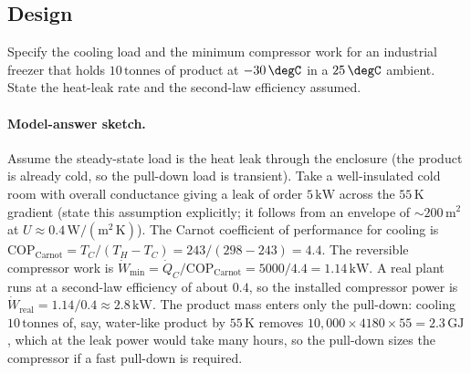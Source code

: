 \subsection*{Design}

\begin{exercise}
Specify the cooling load and the minimum compressor work for an
industrial freezer that holds $10\,\text{tonnes}$ of product at
$-30\,\degC$ in a $25\,\degC$ ambient. State the heat-leak rate and
the second-law efficiency assumed.

\paragraph{Model-answer sketch.} Assume the steady-state load is the
heat leak through the enclosure (the product is already cold, so the
pull-down load is transient). Take a well-insulated cold room with
overall conductance giving a leak of order $5\,\text{kW}$ across the
$55\,\si{\kelvin}$ gradient (state this assumption explicitly; it
follows from an envelope of $\sim 200\,\text{m}^2$ at
$U \approx 0.4\,\text{W}/(\text{m}^2\,\si{\kelvin})$). The Carnot
coefficient of performance for cooling is
$\mathrm{COP}_{\text{Carnot}} = T_C/(T_H - T_C) = 243/(298 - 243) =
4.4$. The reversible compressor work is
$\dot W_{\min} = \dot Q_C/\mathrm{COP}_{\text{Carnot}} = 5000/4.4 =
1.14\,\text{kW}$. A real plant runs at a second-law efficiency of about
$0.4$, so the installed compressor power is
$\dot W_{\text{real}} = 1.14/0.4 \approx 2.8\,\text{kW}$. The product
mass enters only the pull-down: cooling $10\,\text{tonnes}$ of, say,
water-like product by $55\,\si{\kelvin}$ removes
$10{,}000 \times 4180 \times 55 = 2.3\,\text{GJ}$, which at the leak
power would take many hours, so the pull-down sizes the compressor if a
fast pull-down is required.
\end{exercise}

